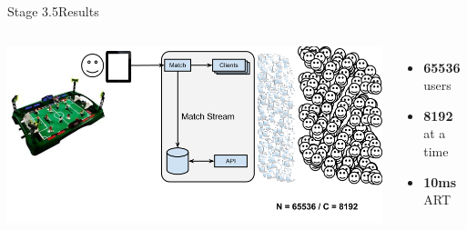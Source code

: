 \documentclass[utf8]{beamer}
\begin{document}
\begin{frame}{Stage 3.5}{Results}
	\begin{columns}
			\includegraphics[top=-1,width=\textwidth]{img/MatchStream-3.png}
			\begin{itemize}
				\item \textbf{\Large 65536} users
				\item \textbf{\Large 8192} at a time
				\item \textbf{\Large 10ms} ART
			\end{itemize}
	\end{columns}
\end{frame}
\end{document}
